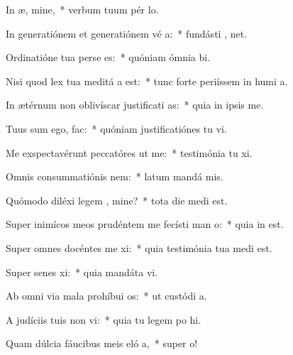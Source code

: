\item In æ, mine,~* verbum tuum pér  lo.
\item In generatiónem et generatiónem vé a:~* fundásti ,  net.
\item Ordinatióne tua perse es:~* quóniam ómnia  bi.
\item Nisi quod lex tua meditá a est:~* tunc forte periíssem in humi a.
\item In ætérnum non oblivíscar justificati as:~* quia in ipsis  me.
\item Tuus sum ego,   fac:~* quóniam justificatiónes tu vi.
\item Me exspectavérunt peccatóres ut  me:~* testimónia tu xi.
\item Omnis consummatiónis  nem:~* latum mandá  mis.
\item Quómodo diléxi legem , mine?~* tota die medi  est.
\item Super inimícos meos prudéntem me fecísti man o:~* quia in   est.
\item Super omnes docéntes me xi:~* quia testimónia tua medi  est.
\item Super senes xi:~* quia mandáta  vi.
\item Ab omni via mala prohíbui  os:~* ut custódi  a.
\item A judíciis tuis non vi:~* quia tu legem po hi.
\item Quam dúlcia fáucibus meis eló a,~* super   o!
